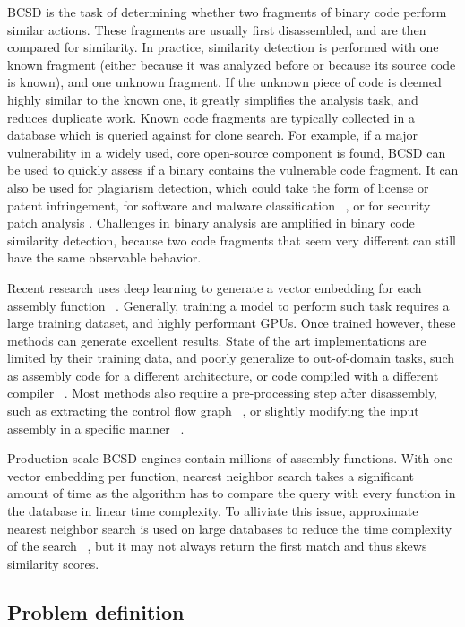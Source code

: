 \documentclass[conference,compsoc]{IEEEtran}
\begin{document}
BCSD is the task of determining whether two fragments of binary code perform similar actions.
These fragments are usually first disassembled, and are then compared for similarity. In practice,
similarity detection is performed with one known fragment (either because it was analyzed before
or because its source code is known), and one unknown fragment. If the unknown piece of code is deemed
highly similar to the known one, it greatly simplifies the analysis task, and reduces duplicate work. Known
code fragments are typically collected in a database which is queried against for clone search. For example,
if a major vulnerability in a widely used, core open-source component is found, BCSD can be used to quickly
assess if a binary contains the vulnerable code fragment. It can also be used for plagiarism detection, which
could take the form of license or patent infringement, for software and malware classification ~\cite{op-seq}, or for 
security patch analysis \cite{patch}. Challenges in binary analysis are amplified in binary code similarity detection,
because two code fragments that seem very different can still have the same observable behavior.

Recent research uses deep learning to generate a vector embedding for each assembly function ~\cite{SAFE,PalmTree,OrderMatters,Asm2Vec,CLAP}.
Generally, training a model to perform such task requires a large training dataset, and highly performant GPUs.
Once trained however, these methods can generate excellent results.
State of the art implementations are limited by their training data, and poorly generalize to out-of-domain tasks,
such as assembly code for a different architecture, or code compiled with a different compiler ~\cite{BCSDsurvey,CLAP}.
Most methods also require a pre-processing step after disassembly, such as extracting the control flow graph
~\cite{OrderMatters,Asm2Vec}, or slightly modifying the input assembly in a specific manner ~\cite{PalmTree,CLAP}.

Production scale BCSD engines contain millions of assembly functions. With one vector embedding per function, nearest neighbor
search takes a significant amount of time as the algorithm has to compare the query with every function in the database in linear
time complexity. To alliviate this issue, approximate nearest neighbor search is used on large databases to reduce the time
complexity of the search ~\cite{ANN,ANN-limits}, but it may not always return the first match and thus skews similarity scores.

\subsection{Problem definition}
\end{document}
